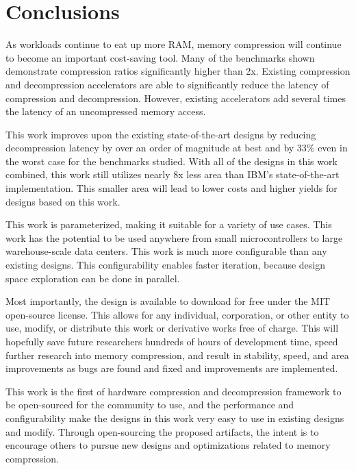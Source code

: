 \documentclass[doublespace,nopageskip]{VTthesis}
\begin{document}
\chapter{Conclusions} \label{ch:conclusions}
As workloads continue to eat up more RAM, memory compression will continue to become an important cost-saving tool. Many of the benchmarks shown demonstrate compression ratios significantly higher than 2x. Existing compression and decompression accelerators are able to significantly reduce the latency of compression and decompression. However, existing accelerators add several times the latency of an uncompressed memory access.

This work improves upon the existing state-of-the-art designs by reducing decompression latency by over an order of magnitude at best and by 33\% even in the worst case for the benchmarks studied. With all of the designs in this work combined, this work still utilizes nearly 8x less area than IBM's state-of-the-art implementation. This smaller area will lead to lower costs and higher yields for designs based on this work.

This work is parameterized, making it suitable for a variety of use cases. This work has the potential to be used anywhere from small microcontrollers to large warehouse-scale data centers. This work is much more configurable than any existing designs. This configurability enables faster iteration, because design space exploration can be done in parallel.

Most importantly, the design is available to download for free under the MIT open-source license. This allows for any individual, corporation, or other entity to use, modify, or distribute this work or derivative works free of charge. This will hopefully save future researchers hundreds of hours of development time, speed further research into memory compression, and result in stability, speed, and area improvements as bugs are found and fixed and improvements are implemented.

This work is the first of hardware compression and decompression framework to be open-sourced for the community to use, and the performance and configurability make the designs in this work very easy to use in existing designs and modify. Through open-sourcing the proposed artifacts, the intent is to encourage others to pursue new designs and optimizations related to memory compression.
\end{document}
